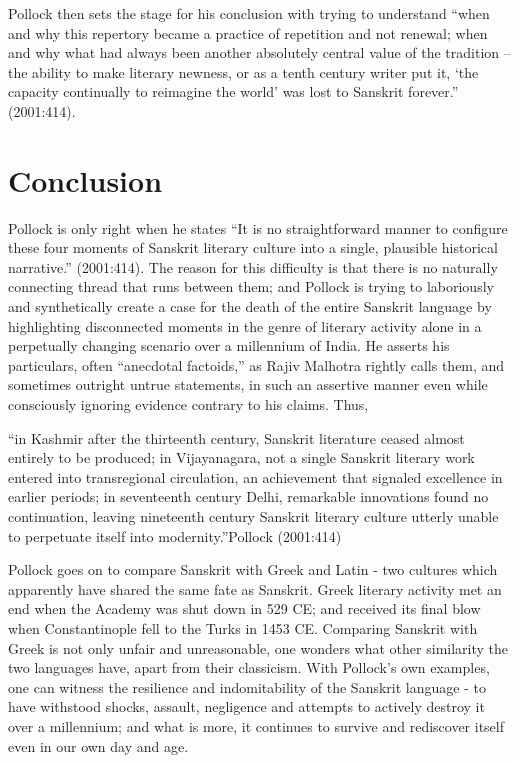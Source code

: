 Pollock then sets the stage for his conclusion with trying to understand “when and why this repertory became a practice of repetition and not renewal; when and why what had always been another absolutely central value of the tradition – the ability to make literary newness, or as a tenth century writer put it, ‘the capacity continually to reimagine the world’ was lost to Sanskrit forever.” (2001:414).

\section*{Conclusion}

Pollock is only right when he states “It is no straightforward manner to configure these four moments of Sanskrit literary culture into a single, plausible historical narrative.” (2001:414). The reason for this difficulty is that there is no naturally connecting thread that runs between them; and Pollock is trying to laboriously and synthetically create a case for the death of the entire Sanskrit language by highlighting disconnected moments in the genre of literary activity alone in a perpetually changing scenario over a millennium of India.  He asserts his particulars, often “anecdotal factoids,” as Rajiv Malhotra rightly calls them, and sometimes outright untrue statements, in such an assertive manner even while consciously ignoring evidence contrary to his claims. Thus, 

\begin{myquote}
“in Kashmir after the thirteenth century, Sanskrit literature ceased almost entirely to be produced; in Vijayanagara, not a single Sanskrit literary work entered into transregional circulation, an achievement that signaled excellence in earlier periods; in seventeenth century Delhi, remarkable innovations found no continuation, leaving nineteenth century Sanskrit literary culture utterly unable to perpetuate itself into modernity.”\hfill Pollock (2001:414) 
\end{myquote}

Pollock goes on to compare Sanskrit with Greek and Latin - two cultures which apparently have shared the same fate as Sanskrit.  Greek literary activity met an end when the Academy was shut down in 529 CE; and received its final blow when Constantinople fell to the Turks in 1453 CE\@. Comparing Sanskrit with Greek is not only unfair and unreasonable, one wonders what other similarity the two languages have, apart from their classicism. With Pollock’s own examples, one can witness the resilience and indomitability of the Sanskrit language - to have withstood shocks, assault, negligence and attempts to actively destroy it over a millennium; and what is more, it continues to survive and rediscover itself even in our own day and age.

